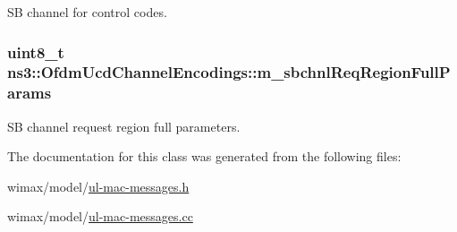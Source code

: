 SB channel for control codes. 

\subsubsection[{\texorpdfstring{m\+\_\+sbchnl\+Req\+Region\+Full\+Params}{m_sbchnlReqRegionFullParams}}]{\setlength{\rightskip}{0pt plus 5cm}uint8\+\_\+t ns3\+::\+Ofdm\+Ucd\+Channel\+Encodings\+::m\+\_\+sbchnl\+Req\+Region\+Full\+Params\hspace{0.3cm}{\ttfamily [private]}}\hypertarget{classns3_1_1OfdmUcdChannelEncodings_ac9d934fd24486ef4f00373181cbad08f}{}\label{classns3_1_1OfdmUcdChannelEncodings_ac9d934fd24486ef4f00373181cbad08f}


SB channel request region full parameters. 



The documentation for this class was generated from the following files\+:\begin{DoxyCompactItemize}
\item 
wimax/model/\hyperlink{ul-mac-messages_8h}{ul-\/mac-\/messages.\+h}\item 
wimax/model/\hyperlink{ul-mac-messages_8cc}{ul-\/mac-\/messages.\+cc}\end{DoxyCompactItemize}
